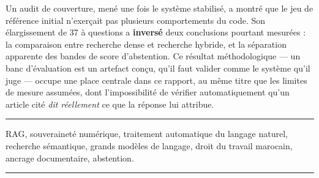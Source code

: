 Un audit de couverture, mené une fois le système stabilisé, a montré que le jeu de référence
initial n'exerçait pas plusieurs comportements du code. Son élargissement de 37 à \NbQuestions{}
questions a \textbf{inversé} deux conclusions pourtant mesurées : la comparaison entre recherche
dense et recherche hybride, et la séparation apparente des bandes de score d'abstention. Ce
résultat méthodologique --- un banc d'évaluation est un artefact conçu, qu'il faut valider comme
le système qu'il juge --- occupe une place centrale dans ce rapport, au même titre que les
limites de mesure assumées, dont l'impossibilité de vérifier automatiquement qu'un article cité
\emph{dit réellement} ce que la réponse lui attribue.

\vspace{0.6cm}
{\color{rule}\rule{\textwidth}{0.8pt}}

\vspace{2pt}
RAG, souveraineté numérique, traitement automatique du langage naturel, recherche sémantique,
grands modèles de langage, droit du travail marocain, ancrage documentaire, abstention.

\vspace{2pt}
{\color{rule}\rule{\textwidth}{0.8pt}}

